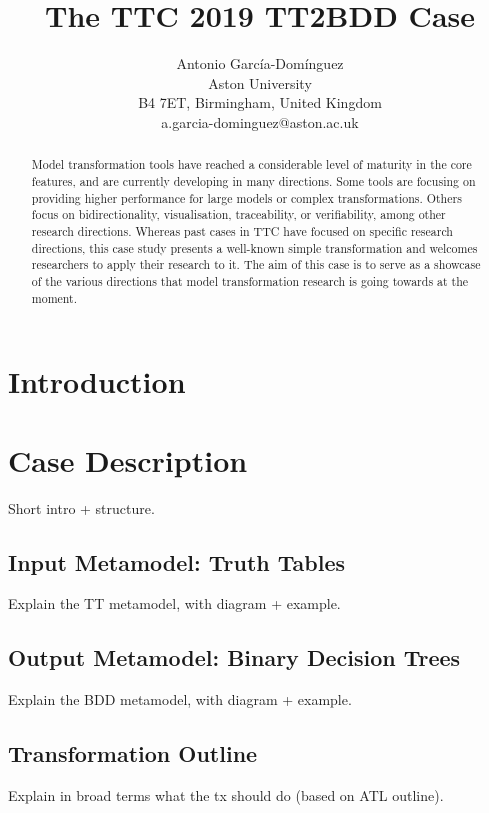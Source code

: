 \documentclass[a4paper]{scrarticle}
\title{The TTC 2019 TT2BDD Case}
\author{
  Antonio García-Domínguez\\
  Aston University\\
  B4 7ET, Birmingham, United Kingdom\\
  a.garcia-dominguez@aston.ac.uk
}
\begin{document}
\maketitle

\begin{abstract}
  Model transformation tools have reached a considerable level of maturity in
  the core features, and are currently developing in many directions. Some tools
  are focusing on providing higher performance for large models or complex
  transformations. Others focus on bidirectionality, visualisation,
  traceability, or verifiability, among other research directions. Whereas past
  cases in TTC have focused on specific research directions, this case study
  presents a well-known simple transformation and welcomes researchers to apply
  their research to it. The aim of this case is to serve as a showcase of the
  various directions that model transformation research is going towards at the
  moment.
\end{abstract}

\section{Introduction}

\section{Case Description}

Short intro + structure.

\subsection{Input Metamodel: Truth Tables}

Explain the TT metamodel, with diagram + example.

\subsection{Output Metamodel: Binary Decision Trees}

Explain the BDD metamodel, with diagram + example.

\subsection{Transformation Outline}

Explain in broad terms what the tx should do (based on ATL outline).
\end{document}
